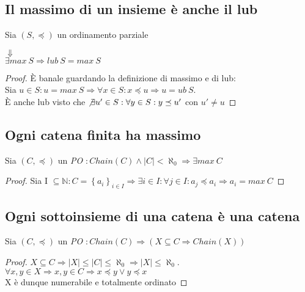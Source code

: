 \subsection{Il massimo di un insieme è anche il lub}
\begin{esercizio}[$\exists max\ S \Rightarrow lub\ S = max\ S$]
  Sia $(S, \preceq)$ un ordinamento parziale
  \begin{center}
    $\Downarrow$\\
    $\exists max\ S \Rightarrow lub\ S = max\ S$
  \end{center}
  \begin{proof}
    È banale guardando la definizione di massimo e di lub:\\
    Sia $u \in S : u = max\ S \Rightarrow \forall x \in S : x \preceq u \Rightarrow u = ub\ S$.\\
    È anche lub visto che $\not \exists u' \in S : \forall y \in S : y \preceq u'$ con $ u' \neq u$
  \end{proof}
\end{esercizio}

\subsection{Ogni catena finita ha massimo}
\begin{esercizio}
  Sia $(C, \preceq)$ un \emph{PO} $: Chain(C) \land |C| < \aleph_0 \Rightarrow \exists max\ C$
  \begin{proof}
    Sia I $\subseteq \mathbb{N} : C = \left\{a_i\right\}_{i \in I} \Rightarrow \exists i \in I : \forall j \in I : a_j \preceq a_i \Rightarrow a_i = max\ C$
    \end{proof}
\end{esercizio}

\subsection{Ogni sottoinsieme di una catena è una catena}
\begin{esercizio}
  Sia $(C, \preceq)$ un \emph{PO} $: Chain(C) \Rightarrow (X \subseteq C \Rightarrow Chain(X))$
  \begin{proof}
    $X \subseteq C \Rightarrow |X| \leq |C| \leq \aleph_0 \Rightarrow |X| \leq \aleph_0$. $\forall x,y \in X \Rightarrow x,y \in C \Rightarrow x \preceq y \lor y \preceq x$\\
    X è dunque numerabile e totalmente ordinato
  \end{proof}
\end{esercizio}


